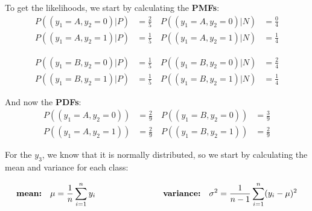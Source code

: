 \documentclass[12pt]{article}
\begin{document}
\begin{enumerate}[leftmargin=\labelsep]
    \vspace{10pt}
    To get the likelihoods, we start by calculating the \textbf{PMFs}:
    \begin{equation*}
        \begin{aligned}
        P((y_1 = A, y_2 = 0)|P) &= \frac{2}{5} \quad P((y_1 = A, y_2 = 0)|N) &= \frac{0}{4}
        \\
        P((y_1 = A, y_2 = 1)|P) &= \frac{1}{5} \quad P((y_1 = A, y_2 = 1)|N) &= \frac{1}{4} 
        \end{aligned}
    \end{equation*}

    \begin{equation*}
        \begin{aligned}
        P((y_1 = B, y_2 = 0)|P) &= \frac{1}{5} \quad P((y_1 = B, y_2 = 0)|N) &= \frac{2}{4}
        \\
        P((y_1 = B, y_2 = 1)|P) &= \frac{1}{5} \quad P((y_1 = B, y_2 = 1)|N) &= \frac{1}{4} 
        \end{aligned}
    \end{equation*}

    \vspace{10pt}
    And now the \textbf{PDFs}:
    \begin{equation*}
        \begin{aligned}
        P((y_1 = A, y_2 = 0)) &= \frac{2}{9} \quad P((y_1 = B, y_2 = 0)) &= \frac{3}{9}
        \\
        P((y_1 = A, y_2 = 1)) &= \frac{2}{9} \quad P((y_1 = B, y_2 = 1)) &= \frac{2}{9} 
        \end{aligned}
    \end{equation*}


    For the $y_3$, we know that it is normally distributed, so we start by calculating the mean and variance for each class:

    \begin{equation*}
            \textbf{\text{mean:}} \quad \mu = \frac{1}{n} \sum_{i=1}^{n} y_i \qquad\qquad\qquad\qquad \textbf{\text{variance:}} \quad \sigma^2 = \frac{1}{n-1} \sum_{i=1}^{n} (y_i - \mu)^2
    \end{equation*}


\end{enumerate}
\end{document}

